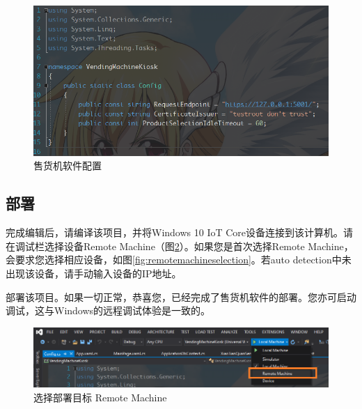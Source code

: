\documentclass[a4paper,11pt]{article}
\theoremstyle{definition}
\begin{document}
    \begin{figure}[htbp]
    \minipage[b][][b]{\textwidth}
        \includegraphics[width=\linewidth]{kioskconfig.png}
        \caption{售货机软件配置}
        \label{fig:kioskconfig}
    \endminipage\hfill
    \end{figure}

\subsection{部署}

完成编辑后，请编译该项目，并将Windows 10 IoT Core设备连接到该计算机。请在调试栏选择设备Remote Machine（图\ref{fig:remotemachine}）。如果您是首次选择Remote Machine，会要求您选择相应设备，如图\ref{fig:remotemachineselection}。若auto detection中未出现该设备，请手动输入设备的IP地址。

部署该项目。如果一切正常，恭喜您，已经完成了售货机软件的部署。您亦可启动调试，这与Windows的远程调试体验是一致的。

    \begin{figure}[htbp]
    \minipage[b][][b]{\textwidth}
        \includegraphics[width=\linewidth]{remotemachine.png}
        \caption{选择部署目标 Remote Machine}
        \label{fig:remotemachine}
    \endminipage\hfill
    \end{figure}
\end{document}
